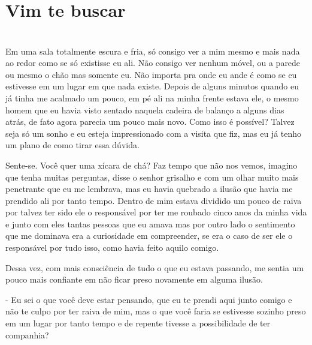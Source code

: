 
\newpage

\ifdefined\useChapters
\chapter{Vim te buscar}
\else
\chapter{}
\fi



Em uma sala totalmente escura e fria, só consigo ver a mim mesmo e mais nada ao redor como se só existisse eu ali. Não consigo ver nenhum móvel, ou a parede ou mesmo o chão mas somente eu. Não importa pra onde eu ande é como se eu estivesse em um lugar em que nada existe. Depois de alguns minutos quando eu já tinha me acalmado um pouco, em pé ali na minha frente estava ele, o mesmo homem que eu havia visto sentado naquela cadeira de balanço a alguns dias atrás, de fato agora parecia um pouco mais novo. Como isso é possível? Talvez seja só um sonho e eu esteja impressionado com a visita que fiz, mas eu já tenho um plano de como tirar essa dúvida.

Sente-se. Você quer uma xícara de chá? Faz tempo que não nos vemos, imagino que tenha muitas perguntas, disse o senhor grisalho e com um olhar muito mais penetrante que eu me lembrava, mas eu havia quebrado a ilusão que havia me prendido ali por tanto tempo. Dentro de mim estava dividido um pouco de raiva por talvez ter sido ele o responsável por ter me roubado cinco anos da minha vida e junto com eles tantas pessoas que eu amava mas por outro lado o sentimento que me dominava era a curiosidade em compreender, se era o caso de ser ele o responsável por tudo isso, como havia feito aquilo comigo.

Dessa vez, com mais consciência de tudo o que eu estava passando, me sentia um pouco mais confiante em não ficar preso novamente em alguma ilusão.

- Eu sei o que você deve estar pensando, que eu te prendi aqui junto comigo e não te culpo por ter raiva de mim, mas o que você faria se estivesse sozinho preso em um lugar por tanto tempo e de repente tivesse a possibilidade de ter companhia?

